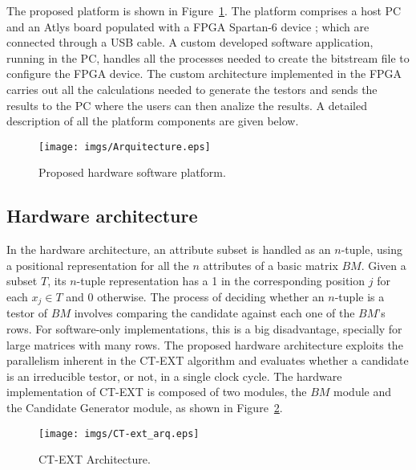 \documentclass[letterpaper, twoside, openright, 12pt]{book}%
\begin{document}
	The proposed platform is shown in Figure~\ref{fig:general}. The platform comprises a host PC and an Atlys board populated with a FPGA Spartan-6 device \citep{Digilent2013}; which are connected through a USB cable. A custom developed software application, running in the PC, handles all the processes needed to create the bitstream file to configure the FPGA device. The custom architecture implemented in the FPGA carries out all the calculations needed to generate the testors and sends the results to the PC where the users can then analize the results. A detailed description of all the platform components are given below.
	
	\begin{figure}[htb]
	    \begin{center}
	       \texttt{[image: imgs/Arquitecture.eps]}
	    \end{center}
	\caption{Proposed hardware software platform.}
	\label{fig:general}
	\end{figure}
%	
\subsection{Hardware architecture}\label{sec:architecture}	
%

	In the hardware architecture, an attribute subset is handled as an $n$-tuple, using a positional representation for all the $n$ attributes of a basic matrix $BM$. Given a subset $T$, its $n$-tuple representation has a 1 in the corresponding position $j$ for each $x_j \in T$ and 0 otherwise. The process of deciding whether an $n$-tuple is a testor of $BM$ involves comparing the candidate against each one of the $BM$'s rows. For software-only implementations, this is a big disadvantage, specially for large matrices with many rows. The proposed hardware architecture exploits the parallelism inherent in the CT-EXT algorithm and evaluates whether a candidate is an irreducible testor, or not, in a single clock cycle. The hardware implementation of CT-EXT is composed of two modules, the $BM$ module and the Candidate Generator module, as shown in Figure~\ref{fig:arquitecture}.
		
	\begin{figure}[htb]
	  \begin{center}
	      \texttt{[image: imgs/CT-ext\_arq.eps]}
	  \end{center}
	\caption{CT-EXT Architecture.}
	\label{fig:arquitecture}
	\end{figure}
	
\end{document}
